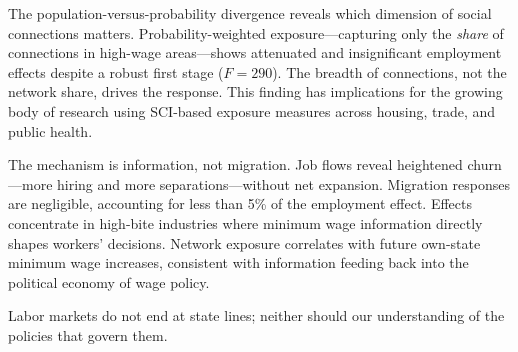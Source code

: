 \documentclass[12pt]{article}
\begin{document}
The population-versus-probability divergence reveals which dimension of social connections matters. Probability-weighted exposure---capturing only the \textit{share} of connections in high-wage areas---shows attenuated and insignificant employment effects despite a robust first stage ($F = 290$). The breadth of connections, not the network share, drives the response. This finding has implications for the growing body of research using SCI-based exposure measures across housing, trade, and public health.

The mechanism is information, not migration. Job flows reveal heightened churn---more hiring and more separations---without net expansion. Migration responses are negligible, accounting for less than 5\% of the employment effect. Effects concentrate in high-bite industries where minimum wage information directly shapes workers' decisions. Network exposure correlates with future own-state minimum wage increases, consistent with information feeding back into the political economy of wage policy.

Labor markets do not end at state lines; neither should our understanding of the policies that govern them.

\label{apep_main_text_end}

\newpage
\end{document}
